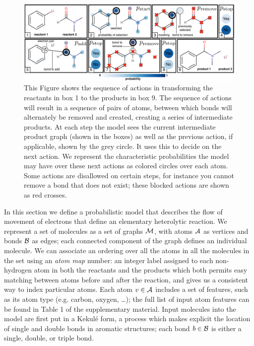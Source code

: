 



\begin{figure}
\centering
\includegraphics[width=\textwidth]{reaction_model_blue}
\caption{
 This Figure shows the sequence of actions in transforming the reactants in box 1 to the products in box 9.
 The sequence of actions will result in a sequence of pairs of atoms, between which bonds will alternately be removed and created, creating a series of intermediate products. 
At each step the model sees the current intermediate product graph (shown in the boxes) as well as the previous action, if applicable, shown by the grey circle. It uses this to decide on the next action.
We represent the characteristic probabilities the model may have over these next actions as colored circles over each atom.
Some actions are disallowed on certain steps, for instance you cannot remove a bond that does not exist; these blocked actions are shown as red crosses.
}
\label{fig:reaction_model}
\end{figure}



In this section we define a probabilistic model that describes the flow of movement of electrons that define an elementary heterolytic reaction.
We represent a set of molecules as a set of graphs ${\mathcal{M}}$, with atoms ${\mathcal{A}}$ as vertices and bonds ${\mathcal{B}}$ as edges;
each connected component of the graph defines an individual molecule.
We can associate an ordering over all the atoms in all the molecules in the set using an {\em atom map} number:
an integer label assigned to each non-hydrogen atom in both the reactants and the products which 
both permits easy matching between atoms before and after the reaction, and
gives us a consistent way to index particular atoms.
Each atom $v \in {\mathcal{A}}$ includes a set of features, such as its atom type (e.g. carbon, oxygen, \dots); the full list of input atom features can be found in Table 1 of the supplementary material.
Input molecules into the model are first put in a Kekul\'e form, a process which makes explicit the location of single and double bonds in aromatic structures;
each bond $b \in {\mathcal{B}}$ is either a single, double, or triple bond.


